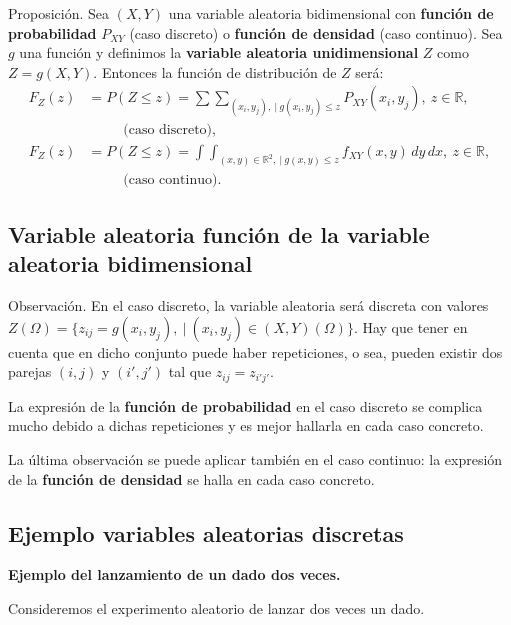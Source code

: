 \documentclass[]{book}
\begin{document}
Proposición.
Sea \((X,Y)\) una variable aleatoria bidimensional con \textbf{función de probabilidad} \(P_{XY}\) (caso discreto) o \textbf{función de densidad} (caso continuo). Sea \(g\) una función y definimos la \textbf{variable aleatoria unidimensional} \(Z\) como \(Z=g(X,Y)\). Entonces la función de distribución de \(Z\) será:
\[
\begin{array}{rl}
F_Z(z) & = P(Z\leq z)=\sum\sum_{(x_i,y_j),\ |\ g(x_i,y_j)\leq z} P_{XY}(x_i,y_j),\ z\in\mathbb{R},\\ &\ \qquad\mbox{ (caso discreto),}\\
F_Z(z) & = P(Z\leq z)=\int\int_{(x,y)\in\mathbb{R}^2,\ |\ g(x,y)\leq z} f_{XY}(x,y)\,dy\, dx, \ z\in\mathbb{R},\\ &\ \qquad\mbox{ (caso continuo).}
\end{array}
\]

\hypertarget{variable-aleatoria-funciuxf3n-de-la-variable-aleatoria-bidimensional-1}{%
\subsection{Variable aleatoria función de la variable aleatoria bidimensional}\label{variable-aleatoria-funciuxf3n-de-la-variable-aleatoria-bidimensional-1}}

Observación.
En el caso discreto, la variable aleatoria será discreta con valores \(Z(\Omega)=\{z_{ij}=g(x_i,y_j),\ |\ (x_i,y_j)\in (X,Y)(\Omega)\}\).
Hay que tener en cuenta que en dicho conjunto puede haber repeticiones, o sea, pueden existir dos parejas \((i,j)\) y \((i',j')\) tal que \(z_{ij}=z_{i'j'}\).

La expresión de la \textbf{función de probabilidad} en el caso discreto se complica mucho debido a dichas repeticiones y es mejor hallarla en cada caso concreto.

La última observación se puede aplicar también en el caso continuo: la expresión de la \textbf{función de densidad} se halla en cada caso concreto.

\hypertarget{ejemplo-variables-aleatorias-discretas}{%
\subsection{Ejemplo variables aleatorias discretas}\label{ejemplo-variables-aleatorias-discretas}}

\textbf{Ejemplo del lanzamiento de un dado dos veces.}

Consideremos el experimento aleatorio de lanzar dos veces un dado.
\end{document}
